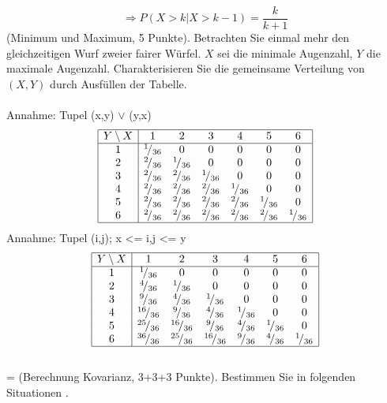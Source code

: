 \documentclass[twoside]{article}
\begin{document}
\[
	\Rightarrow P(X > k | X > k-1) = \frac{k}{k+1}
\]
(Minimum und Maximum, 5 Punkte).
Betrachten Sie einmal mehr den gleichzeitigen Wurf zweier fairer Würfel.
$X$ sei die minimale Augenzahl, $Y$ die maximale Augenzahl.
Charakterisieren Sie die gemeinsame Verteilung von $(X,Y)$ durch Ausfüllen der Tabelle. \\
\\
Annahme: Tupel (x,y) $\lor$ (y,x)
\[
	\begin{array}{|c|cccccc|}\hline
	Y \setminus X	&	1	&	2	&	3	&	4	&	5	&	6	\\ \hline
	1&\ilfrac{1}{36}&0&0&0&0&0\\
	2&\ilfrac{2}{36}&\ilfrac{1}{36}&0&0&0&0\\
	3&\ilfrac{2}{36}&\ilfrac{2}{36}&\ilfrac{1}{36}&0&0&0\\
	4&\ilfrac{2}{36}&\ilfrac{2}{36}&\ilfrac{2}{36}&\ilfrac{1}{36}&0&0\\
	5&\ilfrac{2}{36}&\ilfrac{2}{36}&\ilfrac{2}{36}&\ilfrac{2}{36}&\ilfrac{1}{36}&0\\
	6&\ilfrac{2}{36}&\ilfrac{2}{36}&\ilfrac{2}{36}&\ilfrac{2}{36}&\ilfrac{2}{36}&\ilfrac{1}{36}\\\hline
	\end{array}
\]
Annahme: Tupel (i,j); x <= i,j <= y
\[
	\begin{array}{|c|cccccc|}\hline
	Y \setminus X	&	1	&	2	&	3	&	4	&	5	&	6	\\ \hline
	1&\ilfrac{1}{36}&0&0&0&0&0\\
	2&\ilfrac{4}{36}&\ilfrac{1}{36}&0&0&0&0\\
	3&\ilfrac{9}{36}&\ilfrac{4}{36}&\ilfrac{1}{36}&0&0&0\\
	4&\ilfrac{16}{36}&\ilfrac{9}{36}&\ilfrac{4}{36}&\ilfrac{1}{36}&0&0\\
	5&\ilfrac{25}{36}&\ilfrac{16}{36}&\ilfrac{9}{36}&\ilfrac{4}{36}&\ilfrac{1}{36}&0\\
	6&\ilfrac{36}{36}&\ilfrac{25}{36}&\ilfrac{16}{36}&\ilfrac{9}{36}&\ilfrac{4}{36}&\ilfrac{1}{36}\\\hline
	\end{array}
\]
\vspace{.3cm}\\
\fi
\ifnum\ZettelNeun=\True
{}
(Berechnung Kovarianz, 3+3+3 Punkte).
Bestimmen Sie in folgenden Situationen .
\end{document}
